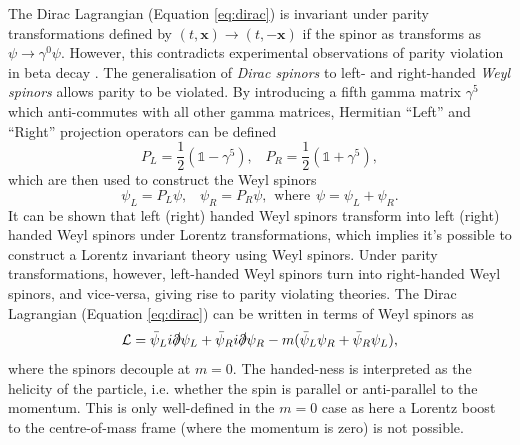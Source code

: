 The Dirac Lagrangian (Equation \ref{eq:dirac}) is invariant under parity transformations defined by $(t,\mathbf{x})\rightarrow(t,-\mathbf{x})$ if the spinor as transforms as $\psi\rightarrow\gamma^0\psi$. However, this contradicts experimental observations of parity violation in beta decay \cite{Theory:parityviolation}. The generalisation of \textit{Dirac spinors} to left- and right-handed \textit{Weyl spinors} allows parity to be violated. By introducing a fifth gamma matrix $\gamma^5$ which anti-commutes with all other gamma matrices, Hermitian ``Left'' and ``Right'' projection operators can be defined
\begin{equation}
    P_L=\frac{1}{2}(\mathds{1}-\gamma^5),\hspace{10pt}P_R=\frac{1}{2}(\mathds{1}+\gamma^5),
\end{equation}
which are then used to construct the Weyl spinors
\begin{equation}
    \psi_L=P_L\psi,\hspace{10pt}\psi_R=P_R\psi,\hspace{5pt}\text{where}\hspace{5pt}\psi=\psi_L+\psi_R.
\end{equation}
It can be shown that left (right) handed Weyl spinors transform into left (right) handed Weyl spinors under Lorentz transformations, which implies it's possible to construct a Lorentz invariant theory using Weyl spinors. Under parity transformations, however, left-handed Weyl spinors turn into right-handed Weyl spinors, and vice-versa, giving rise to parity violating theories. The Dirac Lagrangian (Equation \ref{eq:dirac}) can be written in terms of Weyl spinors as
\begin{equation}\label{eq:weyllag}
    \mathcal{L}=\bar{\psi}_Li\slashed{\partial}\psi_L+\bar{\psi}_Ri\slashed{\partial}\psi_R-m(\bar{\psi}_L\psi_R+\bar{\psi}_R\psi_L),
\end{equation}
where the spinors decouple at $m=0$. The handed-ness is interpreted as the helicity of the particle, i.e. whether the spin is parallel or anti-parallel to the momentum. This is only well-defined in the $m=0$ case as here a Lorentz boost to the centre-of-mass frame (where the momentum is zero) is not possible.

